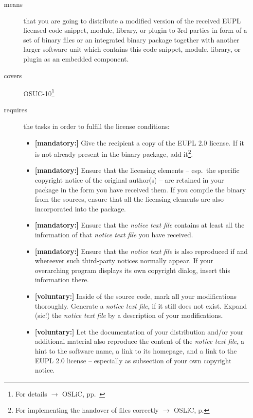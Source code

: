 \begin{description}
\item[means] that you are going to distribute a modified version of the received
EUPL licensed code snippet, module, library, or plugin to 3rd parties in form
of a set of binary files or an integrated binary package together with another
larger software unit which contains this code snippet, module, library, or
plugin as an embedded component.
\item[covers] OSUC-10\footnote{For details $\rightarrow$ OSLiC, pp.\ \pageref{OSUC-10-DEF}}
\item[requires] the tasks in order to fulfill the license conditions:
\begin{itemize}
  
  \item \textbf{[mandatory:]} Give the recipient a copy of the EUPL 2.0
  license. If it is not already present in the binary package, add
  it\footnote{For implementing the handover of files correctly $\rightarrow$
  OSLiC, p. \pageref{DistributingFilesHint}}.
  
  \item \textbf{[mandatory:]} Ensure that the licensing elements -- esp.\ the
  specific copyright notice of the original author(s) -- are retained in your
  package in the form you have received them. If you compile the binary from the
  sources, ensure that all the licensing elements are also incorporated into the
  package.
  
  \item \textbf{[mandatory:]} Ensure that the \emph{notice text file} contains at least
  all the information of that \emph{notice text file} you have received.
 
  \item \textbf{[mandatory:]} Ensure that the \emph{notice text file} is also
  reproduced if and whereever such third-party notices normally appear. If your
  overarching program displays its own copyright dialog, insert this information
  there.
     
  \item \textbf{[voluntary:]} Inside of the source code, mark all your
  modifications thoroughly. Generate a \emph{notice text file}, if it still does not
  exist. Expand (sic!) the \emph{notice text file} by a description of your
  modifications.
 
  \item \textbf{[voluntary:]} Let the documentation of your distribution and/or
  your additional material also reproduce the content of the \emph{notice text
  file}, a hint to the software name, a link to its homepage, and a link to the
  EUPL 2.0 license -- especially as subsection of your own copyright notice.
  


\end{itemize}
\end{description}
